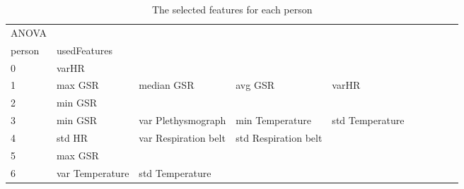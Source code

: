 \begin{landscape}
\begin{table}[]
\centering
\caption{The selected features for each person}
\begin{tabular}{l|llllllll}
ANOVA    &                         &                       &                         &                         &                         &                       &                      &          &                      &        \\
person   & usedFeatures            &                       &                         &                         &                         &                       &                      &          &                      &        \\
0        & varHR                   &                       &                         &                         &                         &                       &                      &          &                      &        \\
1        & max GSR                 & median GSR            & avg GSR                 & varHR                   &                         &                       &                      &          &                      &        \\
2        & min GSR                 &                       &                         &                         &                         &                       &                      &          &                      &        \\
3        & min GSR                 & var Plethysmograph    & min Temperature         & std Temperature         &                         &                       &                      &          &                      &        \\
4        & std HR                  & var Respiration belt  & std Respiration belt    &                         &                         &                       &                      &          &                      &        \\
5        & max GSR                 &                       &                         &                         &                         &                       &                      &          &                      &        \\
6        & var Temperature         & std Temperature       &                         &                         &                         &                       &                      &          &                      &        \\

\end{tabular}
\end{table}
\end{landscape}
